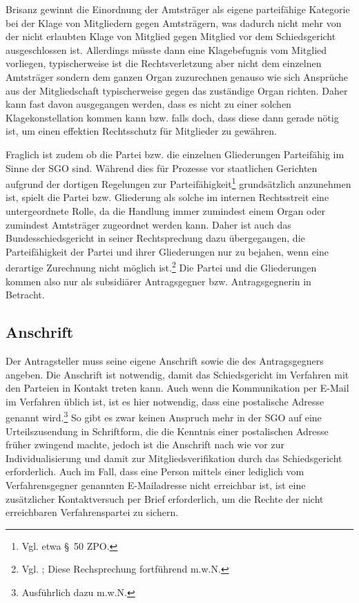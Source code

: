 Brisanz gewinnt die Einordnung der Amtsträger als eigene parteifähige Kategorie bei der Klage von Mitgliedern gegen Amtsträgern, was dadurch nicht mehr von der nicht erlaubten Klage von Mitglied gegen Mitglied vor dem Schiedsgericht ausgeschlossen ist.
Allerdings müsste dann eine Klagebefugnis vom Mitglied vorliegen, typischerweise ist die Rechtsverletzung aber nicht dem  einzelnen Amtsträger sondern dem ganzen Organ zuzurechnen genauso wie sich Ansprüche aus der Mitgliedschaft typischerweise gegen das zuständige Organ richten. 
Daher kann fast davon ausgegangen werden, dass es nicht zu einer solchen Klagekonstellation kommen kann bzw. falls doch, dass diese dann gerade nötig ist, um einen effektien Rechtsschutz für Mitglieder zu gewähren.

Fraglich ist zudem ob die Partei bzw. die einzelnen Gliederungen Parteifähig im Sinne der SGO sind.
Während dies für Prozesse vor staatlichen Gerichten aufgrund der dortigen Regelungen zur Parteifähigkeit\footnote{Vgl. etwa \S~50 ZPO.} grundsätzlich anzunehmen ist, spielt die Partei bzw. Gliederung als solche im internen Rechtsstreit eine untergeordnete Rolle, da die Handlung immer zumindest einem Organ oder zumindest Amtsträger zugeordnet werden kann.
Daher ist auch das Bundesschiedsgericht in seiner Rechtsprechung dazu übergegangen, die Parteifähigkeit der Partei und ihrer Gliederungen nur zu bejahen, wenn eine derartige Zurechnung nicht möglich ist.\footnote{Vgl. \cite[S. 4]{BSG1614HS}; Diese Rechsprechung fortführend \cite[S. 2]{BSG3815HS} m.w.N.}
Die Partei und die Gliederungen kommen also nur als subsidiärer Antragsgegner bzw. Antragsgegnerin in Betracht.

\subsection{Anschrift}
\label{Anrufung:Statthaftigkeit:Anschrift}
Der Antragsteller muss seine eigene Anschrift sowie die des Antragsgegners angeben.
Die Anschrift ist notwendig, damit das Schiedsgericht im Verfahren mit den Parteien in Kontakt treten kann.
Auch wenn die Kommunikation per E-Mail im Verfahren üblich ist, ist es hier notwendig, dass eine postalische Adresse genannt wird.\footnote{Ausführlich dazu \cite[S. 3]{BSG20130715} m.w.N.}
So gibt es zwar keinen Anspruch mehr in der SGO auf eine Urteilszusendung in Schriftform, die die Kenntnis einer postalischen Adresse früher zwingend machte, jedoch ist die Anschrift nach wie vor zur Individualisierung und damit zur Mitgliedsverifikation durch das Schiedsgericht erforderlich. Auch im Fall, dass eine Person mittels einer lediglich vom Verfahrensgegner genannten E-Mailadresse nicht erreichbar ist, ist eine zusätzlicher Kontaktversuch per Brief erforderlich, um die Rechte der nicht erreichbaren Verfahrenspartei zu sichern.

